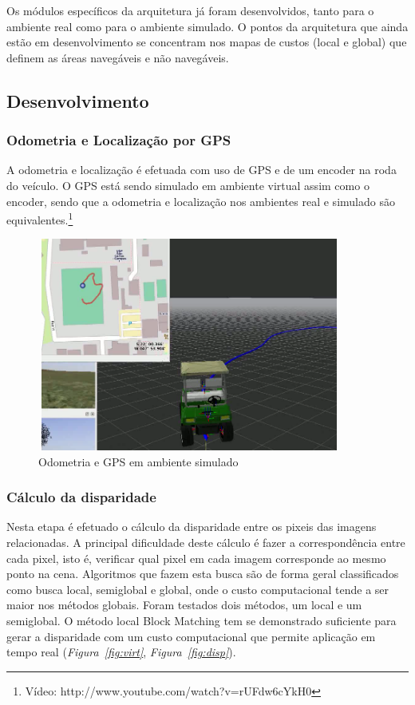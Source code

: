 \documentclass{article}
\newcommand{\foot}[1]{\footnote{	\fontfamily{cmss}\selectfont\footnotesize{#1}}}
\newcommand{\fig}[1]{\textit{Figura~\ref{#1}}}
\begin{document}
Os módulos específicos da arquitetura já foram desenvolvidos, tanto para o
ambiente real como para o ambiente simulado. O pontos da arquitetura que ainda
estão em desenvolvimento se concentram nos mapas de custos (local e global) que
definem as áreas navegáveis e não navegáveis.


\subsection{Desenvolvimento}


\subsubsection{Odometria e Localização por GPS}

A odometria e localização é efetuada com uso de GPS e de um encoder na roda do
veículo. O GPS está sendo simulado em ambiente virtual assim como o encoder,
sendo que a odometria e localização nos ambientes real e simulado são
equivalentes.\foot{Vídeo: http://www.youtube.com/watch?v=rUFdw6cYkH0}

\begin{figure}[!h]
  	\centering
    \includegraphics[width=10cm,height=7cm,]{../images/arq_odogps.png}
 	\caption{Odometria e GPS em ambiente simulado}
 	\label{fig:odogps}
\end{figure}

\subsubsection{Cálculo da disparidade}

Nesta etapa é efetuado o cálculo da disparidade entre os pixeis das imagens
relacionadas. A principal dificuldade deste cálculo é fazer a correspondência
entre cada pixel, isto é, verificar qual pixel em cada imagem
corresponde ao mesmo ponto na cena. Algoritmos que fazem esta busca são de forma
geral classificados como busca local, semiglobal e global, onde o custo
computacional tende a ser maior nos métodos globais. Foram testados dois
métodos, um local e um semiglobal. O método local Block Matching tem se
demonstrado suficiente para gerar a disparidade com um custo computacional que
permite aplicação em tempo real (\fig{fig:virt}, \fig{fig:disp}).
\end{document}
